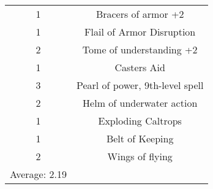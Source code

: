 \documentclass[letterpaper, 10pt]{article}
\begin{document}
\begin{center}
\begin{tabular}{|| c c ||}
    1  & Bracers of armor +2\\
    1  & Flail of Armor Disruption\\
    2  & Tome of understanding +2\\
    1  & Casters Aid\\
    3  & Pearl of power, 9th-level spell\\
    2  & Helm of underwater action\\
    1  & Exploding Caltrops\\
    1  & Belt of Keeping\\
    2  & Wings of flying\\
    \hline
    Average: 2.19 & \\
    \hline
    \hline
    \end{tabular}
\end{center}
\newpage
\end{document}
